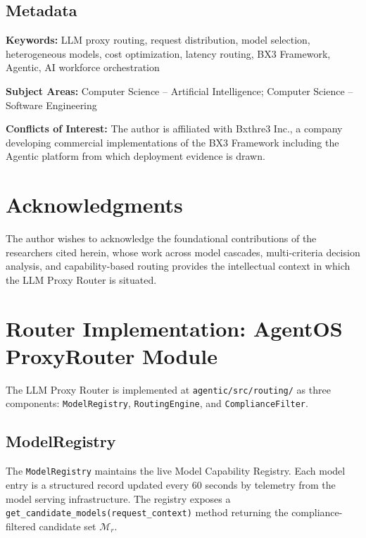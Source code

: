 \documentclass[12pt]{article}
\begin{document}
\subsection*{Metadata}

\textbf{Keywords:} LLM proxy routing, request distribution, model selection, heterogeneous models, cost optimization, latency routing, BX3 Framework, Agentic, AI workforce orchestration

\textbf{Subject Areas:} Computer Science -- Artificial Intelligence; Computer Science -- Software Engineering

\textbf{Conflicts of Interest:} The author is affiliated with Bxthre3 Inc., a company developing commercial implementations of the BX3 Framework including the Agentic platform from which deployment evidence is drawn.

\section*{Acknowledgments}

The author wishes to acknowledge the foundational contributions of the researchers cited herein, whose work across model cascades, multi-criteria decision analysis, and capability-based routing provides the intellectual context in which the LLM Proxy Router is situated.


\section{Router Implementation: AgentOS ProxyRouter Module}
\label{sec:router-implementation}

The LLM Proxy Router is implemented at \texttt{agentic/src/routing/} as three components: \texttt{ModelRegistry}, \texttt{RoutingEngine}, and \texttt{ComplianceFilter}.

\subsection{ModelRegistry}
The \texttt{ModelRegistry} maintains the live Model Capability Registry. Each model entry is a structured record updated every 60 seconds by telemetry from the model serving infrastructure. The registry exposes a \texttt{get\_candidate\_models(request\_context)} method returning the compliance-filtered candidate set $\mathcal{M}_r$.
\end{document}
